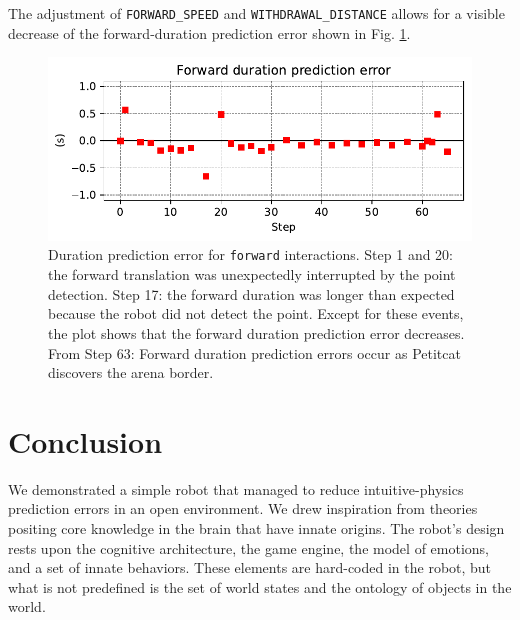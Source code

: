 \documentclass[runningheads]{llncs}
\begin{document}
The adjustment of \texttt{FORWARD\_SPEED} and \texttt{WITHDRAWAL\_DIS\-TANCE} allows for a visible decrease of the forward-duration prediction error shown in Fig. \ref{fig:forward_re}.

\begin{figure}
	\includegraphics[width=\textwidth]{07_Forward_duration_pe.pdf}
	\caption{Duration prediction error for \texttt{forward} interactions.
	Step 1 and 20: the forward translation was unexpectedly interrupted by the point detection.
	Step 17: the forward duration was longer than expected because the robot did not detect the point.
	Except for these events, the plot shows that the forward duration prediction error decreases.
	From Step 63: Forward duration prediction errors occur as Petitcat discovers the arena border.
	} \label{fig:forward_re}
\end{figure}


\section{Conclusion}

We demonstrated a simple robot that managed to reduce intuitive-physics prediction errors in an open environment. 
We drew inspiration from theories positing core knowledge in the brain that have innate origins.
The robot's design rests upon the cognitive architecture, the game engine, the model of emotions, and a set of innate behaviors.
These elements are hard-coded in the robot, but what is not predefined is the set of world states and the ontology of objects in the world.
\end{document}
